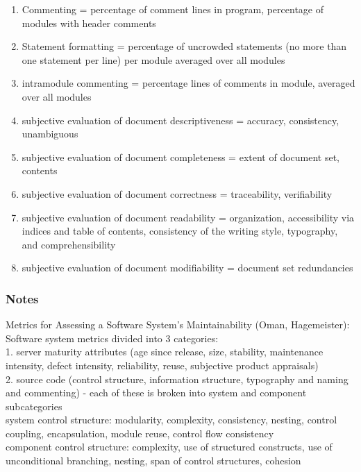 \documentclass{article}
\begin{document}
\begin{enumerate}
\item Commenting =  percentage of comment lines in program, percentage of modules with header comments
\item Statement formatting =  percentage of uncrowded statements (no more than one statement per line) per module averaged over all modules
\item intramodule commenting = percentage lines of comments in module, averaged over all modules
\item subjective evaluation of document descriptiveness = accuracy, consistency, unambiguous
\item subjective evaluation of document completeness = extent of document set, contents
\item subjective evaluation of document correctness = traceability, verifiability
\item subjective evaluation of document readability = organization, accessibility via indices and table of contents, consistency of the writing style, typography, and comprehensibility
\item subjective evaluation of document modifiability = document set redundancies
\end{enumerate}
\subsubsection{Notes}


Metrics for Assessing a Software System's Maintainability (Oman, Hagemeister):\\
Software system metrics divided into 3 categories:\\

1. server maturity attributes (age since release, size, stability, maintenance intensity, defect intensity, reliability, reuse, subjective product appraisals)\\

2. source code (control structure, information structure, typography and naming and commenting) - each of these is broken into system and component subcategories\\

system control structure: modularity, complexity, consistency, nesting, control coupling, encapsulation, module reuse, control flow consistency\\

component control structure: complexity, use of structured constructs, use of unconditional branching, nesting, span of control structures, cohesion\\
\end{document}
